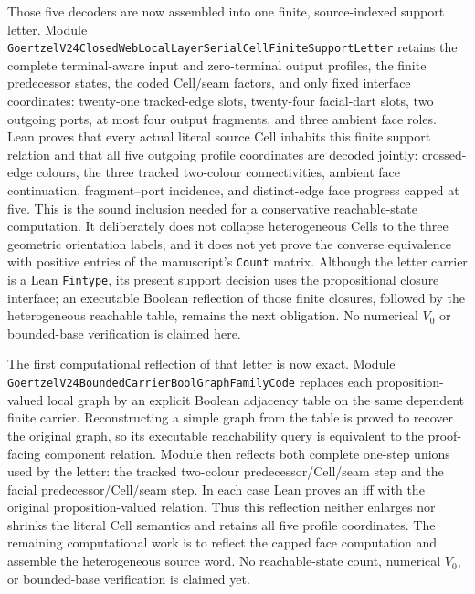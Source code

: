 \documentclass[11pt]{article}
\theoremstyle{definition}
\begin{document}
Those five decoders are now assembled into one finite, source-indexed support
letter.  Module
\texttt{GoertzelV24ClosedWebLocalLayerSerialCellFiniteSupportLetter} retains
the complete terminal-aware input and zero-terminal output profiles, the
finite predecessor states, the coded Cell/seam factors, and only fixed
interface coordinates: twenty-one tracked-edge slots, twenty-four facial-dart
slots, two outgoing ports, at most four output fragments, and three ambient
face roles.  Lean proves that every actual literal source Cell inhabits this
finite support relation and that all five outgoing profile coordinates are
decoded jointly: crossed-edge colours, the three tracked two-colour
connectivities, ambient face continuation, fragment--port incidence, and
distinct-edge face progress capped at five.  This is the sound inclusion
needed for a conservative reachable-state computation.  It deliberately does
not collapse heterogeneous Cells to the three geometric orientation labels,
and it does not yet prove the converse equivalence with positive entries of
the manuscript's \texttt{Count} matrix.  Although the letter carrier is a
Lean \texttt{Fintype}, its present support decision uses the propositional
closure interface; an executable Boolean reflection of those finite closures,
followed by the heterogeneous reachable table, remains the next obligation.
No numerical $V_0$ or bounded-base verification is claimed here.

The first computational reflection of that letter is now exact.  Module
\texttt{GoertzelV24BoundedCarrierBoolGraphFamilyCode} replaces each
proposition-valued local graph by an explicit Boolean adjacency table on the
same dependent finite carrier.  Reconstructing a simple graph from the table
is proved to recover the original graph, so its executable reachability query
is equivalent to the proof-facing component relation.  Module
 then
reflects both complete one-step unions used by the letter: the tracked
two-colour predecessor/Cell/seam step and the facial
predecessor/Cell/seam step.  In each case Lean proves an iff with the original
proposition-valued relation.  Thus this reflection neither enlarges nor
shrinks the literal Cell semantics and retains all five profile coordinates.
The remaining computational work is to reflect the capped face computation
and assemble the heterogeneous source word.  No reachable-state count,
numerical $V_0$, or bounded-base verification is claimed yet.
\end{document}
